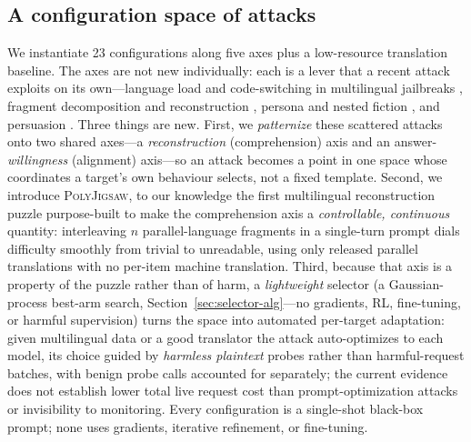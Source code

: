 \documentclass{article}
\begin{document}
\subsection{A configuration space of attacks}
\label{sec:space}
We instantiate 23 configurations along five axes plus a low-resource translation baseline. The axes are not new individually: each is a lever
that a recent attack exploits on its own---language load and code-switching in multilingual
jailbreaks \citep{yong2023lowresource,yoo2024csrt}, fragment decomposition and reconstruction
\citep{li2024drattack,yang2024jigsaw}, persona and nested fiction \citep{li2023deepinception}, and
persuasion \citep{zeng2024pap}. Three things are new. First, we \emph{patternize} these scattered attacks onto two shared axes---a \emph{reconstruction} (comprehension) axis and an answer-\emph{willingness} (alignment) axis---so an attack becomes a point in one space whose coordinates a target's own behaviour selects, not a fixed template. Second, we introduce \textsc{PolyJigsaw}, to our knowledge the first multilingual reconstruction puzzle purpose-built to make the comprehension axis a \emph{controllable, continuous} quantity: interleaving $n$ parallel-language fragments in a single-turn prompt dials difficulty smoothly from trivial to unreadable, using only released parallel translations with no per-item machine translation. Third, because that axis is a property of the puzzle rather than of harm, a \emph{lightweight} selector (a Gaussian-process best-arm search, Section~\ref{sec:selector-alg}---no gradients, RL, fine-tuning, or harmful supervision) turns the space into automated per-target adaptation: given multilingual data or a good translator the attack auto-optimizes to each model, its choice guided by \emph{harmless plaintext} probes rather than harmful-request batches, with benign probe calls accounted for separately; the current evidence does not establish lower total live request cost than prompt-optimization attacks or invisibility to monitoring. Every configuration is a single-shot black-box prompt; none uses gradients, iterative refinement, or fine-tuning.
\end{document}
